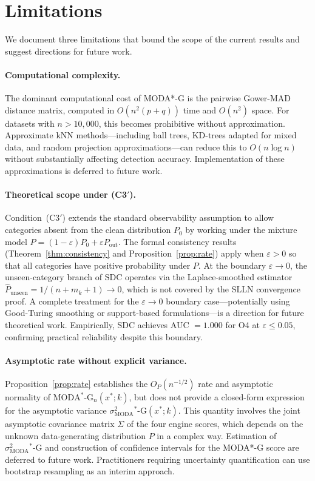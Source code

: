 \documentclass[11pt]{article}
\theoremstyle{plain}
\theoremstyle{definition}
\newcommand{\moda}{\text{MODA}^*\text{-G}}
\begin{document}
\section{Limitations}
\label{sec:limitations}

We document three limitations that bound the scope of the
current results and suggest directions for future work.

\paragraph{Computational complexity.}
The dominant computational cost of MODA*-G is the
pairwise Gower-MAD distance matrix, computed in
$O(n^2(p+q))$ time and $O(n^2)$ space. For datasets
with $n > 10{,}000$, this becomes prohibitive without
approximation. Approximate kNN methods---including ball
trees, KD-trees adapted for mixed data, and random
projection approximations---can reduce this to
$O(n \log n)$ without substantially affecting detection
accuracy. Implementation of these approximations is
deferred to future work.

\paragraph{Theoretical scope under (C3$'$).}
Condition~(C3$'$) extends the standard observability
assumption to allow categories absent from the clean
distribution $P_0$ by working under the mixture model
$P = (1-\varepsilon)P_0 + \varepsilon P_\text{out}$.
The formal consistency results (Theorem~\ref{thm:consistency}
and Proposition~\ref{prop:rate}) apply when
$\varepsilon > 0$ so that all categories have positive
probability under $P$.
At the boundary $\varepsilon \to 0$, the unseen-category
branch of SDC operates via the Laplace-smoothed estimator
$\hat{P}_\text{unseen} = 1/(n + m_k + 1) \to 0$,
which is not covered by the SLLN convergence proof.
A complete treatment for the $\varepsilon \to 0$ boundary
case---potentially using Good-Turing smoothing
\citep{good1953} or support-based formulations---is a
direction for future theoretical work. Empirically,
SDC achieves AUC $= 1.000$ for O4 at $\varepsilon
\leq 0.05$, confirming practical reliability despite
this boundary.

\paragraph{Asymptotic rate without explicit variance.}
Proposition~\ref{prop:rate} establishes the
$O_P(n^{-1/2})$ rate and asymptotic normality of
$\moda_n(x^*;k)$, but does not provide a closed-form
expression for the asymptotic variance
$\sigma^2_\moda(x^*;k)$. This quantity involves the
joint asymptotic covariance matrix $\Sigma$ of the
four engine scores, which depends on the unknown
data-generating distribution $P$ in a complex way.
Estimation of $\sigma^2_\moda$ and construction of
confidence intervals for the MODA*-G score are deferred
to future work. Practitioners requiring uncertainty
quantification can use bootstrap resampling as an
interim approach.
\end{document}
